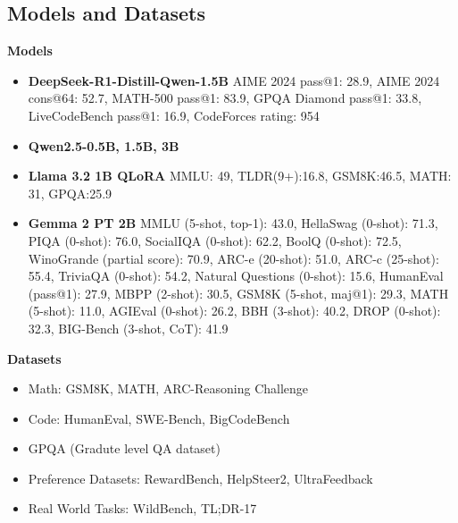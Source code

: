 
\subsection{Models and Datasets}

\textbf{Models}
\begin{itemize}
    \item \textbf{DeepSeek-R1-Distill-Qwen-1.5B} AIME 2024 pass@1: 28.9, AIME 2024 cons@64: 52.7, MATH-500 pass@1: 83.9, GPQA Diamond pass@1: 33.8, LiveCodeBench pass@1: 16.9, CodeForces rating: 954
    \item \textbf{Qwen2.5-0.5B, 1.5B, 3B}
    \item \textbf{Llama 3.2 1B QLoRA} MMLU: 49, TLDR(9+):16.8, GSM8K:46.5, MATH: 31, GPQA:25.9
    \item \textbf{Gemma 2 PT 2B} MMLU (5-shot, top-1): 43.0, HellaSwag (0-shot): 71.3, PIQA (0-shot): 76.0, SocialIQA (0-shot): 62.2, BoolQ (0-shot): 72.5, WinoGrande (partial score): 70.9, ARC-e (20-shot): 51.0, ARC-c (25-shot): 55.4, TriviaQA (0-shot): 54.2, Natural Questions (0-shot): 15.6, HumanEval (pass@1): 27.9, MBPP (2-shot): 30.5, GSM8K (5-shot, maj@1): 29.3, MATH (5-shot): 11.0, AGIEval (0-shot): 26.2, BBH (3-shot): 40.2, DROP (0-shot): 32.3, BIG-Bench (3-shot, CoT): 41.9

\end{itemize}

\textbf{Datasets}
\begin{itemize}
    \item Math: GSM8K, MATH, ARC-Reasoning Challenge
    \item Code: HumanEval, SWE-Bench, BigCodeBench
    \item GPQA (Gradute level QA dataset)
    \item Preference Datasets: RewardBench, HelpSteer2, UltraFeedback
    \item Real World Tasks: WildBench, TL;DR-17
\end{itemize}

